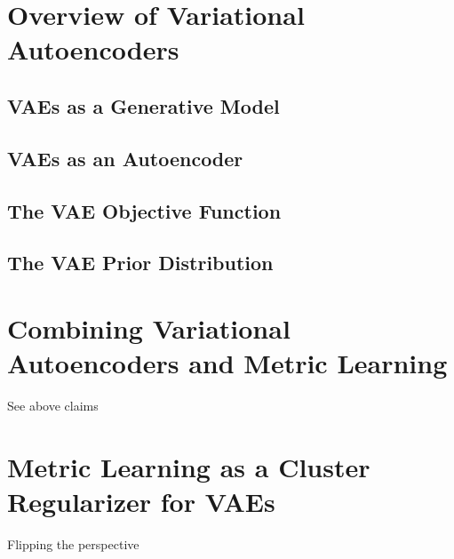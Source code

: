 \documentclass[./dissertation.tex]{subfiles}
\begin{document}

    \section{Overview of Variational Autoencoders}
    \subsection{VAEs as a Generative Model}
    \subsection{VAEs as an Autoencoder}
    \subsection{The VAE Objective Function}
    \subsection{The VAE Prior Distribution}

    \section{Combining Variational Autoencoders and Metric Learning}
    See above claims
    
    \section{Metric Learning as a Cluster Regularizer for VAEs}
    Flipping the perspective 

    
\end{document}
